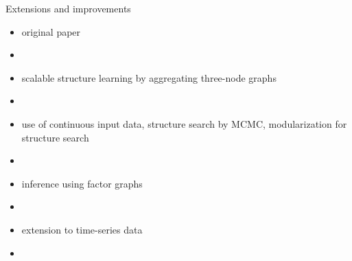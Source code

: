 \documentclass{beamer}
\begin{document}
\begin{frame}{Extensions and improvements}
\begin{itemize}\small
\item original paper 
\item[] {\tiny {}}
\item scalable structure learning by aggregating three-node graphs
\item[] {\tiny {}}
\item use of continuous input data, structure search by MCMC, modularization for structure search
\item[] {\tiny {}}
\item inference using factor graphs
\item[] {\tiny {}}
\item extension to time-series data
\item[] {\tiny {}}
\end{itemize}
\end{frame}
\end{document}
